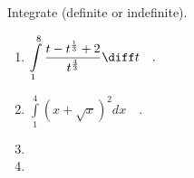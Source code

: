 Integrate (definite or indefinite).
\begin{enumerate}
\item $\displaystyle\int\limits_{1}^{8} \frac{t-t^{\frac{1}{3}}+ 2}{ t^{\frac{4}{3}}} \diff t\quad .$

\item $\displaystyle\int\limits_{1}^{4} \left(x+\sqrt{x}\right)^2 dx\quad .$

\item 

\item 
\end{enumerate}
